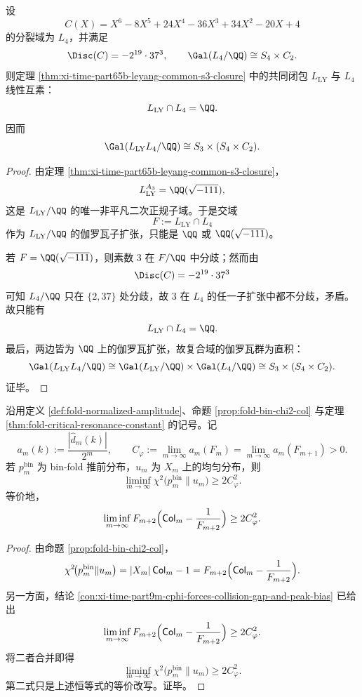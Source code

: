 \begin{corollary}\label{cor:xi-time-part65b-leyang-lattes-linear-disjointness}
设
\[
C(X)=X^6-8X^5+24X^4-36X^3+34X^2-20X+4
\]
的分裂域为 \(L_4\)，并满足
\[
\Disc(C)=-2^{19}\cdot 37^3,
\qquad
\Gal(L_4/\QQ)\cong S_4\times C_2.
\]
则定理 \ref{thm:xi-time-part65b-leyang-common-s3-closure} 中的共同闭包 \(L_{\mathrm{LY}}\) 与 \(L_4\) 线性互素：
\[
L_{\mathrm{LY}}\cap L_4=\QQ.
\]
因而
\[
\Gal(L_{\mathrm{LY}}L_4/\QQ)
\cong
S_3\times (S_4\times C_2).
\]
\end{corollary}
\begin{proof}
由定理 \ref{thm:xi-time-part65b-leyang-common-s3-closure}，
\[
L_{\mathrm{LY}}^{A_3}=\QQ(\sqrt{-111}),
\]
这是 \(L_{\mathrm{LY}}/\QQ\) 的唯一非平凡二次正规子域。于是交域
\[
F:=L_{\mathrm{LY}}\cap L_4
\]
作为 \(L_{\mathrm{LY}}/\QQ\) 的伽罗瓦子扩张，只能是 \(\QQ\) 或 \(\QQ(\sqrt{-111})\)。

若 \(F=\QQ(\sqrt{-111})\)，则素数 \(3\) 在 \(F/\QQ\) 中分歧；然而由
\[
\Disc(C)=-2^{19}\cdot 37^3
\]
可知 \(L_4/\QQ\) 只在 \(\{2,37\}\) 处分歧，故 \(3\) 在 \(L_4\) 的任一子扩张中都不分歧，矛盾。故只能有
\[
L_{\mathrm{LY}}\cap L_4=\QQ.
\]
最后，两边皆为 \(\QQ\) 上的伽罗瓦扩张，故复合域的伽罗瓦群为直积：
\[
\Gal(L_{\mathrm{LY}}L_4/\QQ)
\cong
\Gal(L_{\mathrm{LY}}/\QQ)\times \Gal(L_4/\QQ)
\cong
S_3\times (S_4\times C_2).
\]
证毕。
\end{proof}

\begin{theorem}\label{thm:xi-time-part65b-cphi-chi2-gap-floor}
沿用定义 \ref{def:fold-normalized-amplitude}、命题 \ref{prop:fold-bin-chi2-col} 与定理 \ref{thm:fold-critical-resonance-constant} 的记号。记
\[
a_m(k):=\frac{|\widehat d_m(k)|}{2^m},
\qquad
C_\varphi:=\lim_{m\to\infty}a_m(F_m)=\lim_{m\to\infty}a_m(F_{m+1})>0.
\]
若 \(p_m^{\mathrm{bin}}\) 为 bin-fold 推前分布，\(u_m\) 为 \(X_m\) 上的均匀分布，则
\[
\liminf_{m\to\infty}\chi^2\!\bigl(p_m^{\mathrm{bin}}\|u_m\bigr)\ge 2C_\varphi^2.
\]
等价地，
\[
\liminf_{m\to\infty}
F_{m+2}\Bigl(\mathsf{Col}_m-\frac{1}{F_{m+2}}\Bigr)
\ge
2C_\varphi^2.
\]
\end{theorem}
\begin{proof}
由命题 \ref{prop:fold-bin-chi2-col}，
\[
\chi^2\!\bigl(p_m^{\mathrm{bin}}\|u_m\bigr)
=
|X_m|\,\mathsf{Col}_m-1
=
F_{m+2}\Bigl(\mathsf{Col}_m-\frac{1}{F_{m+2}}\Bigr).
\]
另一方面，结论 \ref{con:xi-time-part9m-cphi-forces-collision-gap-and-peak-bias} 已给出
\[
\liminf_{m\to\infty}
F_{m+2}\Bigl(\mathsf{Col}_m-\frac{1}{F_{m+2}}\Bigr)
\ge
2C_\varphi^2.
\]
将二者合并即得
\[
\liminf_{m\to\infty}\chi^2\!\bigl(p_m^{\mathrm{bin}}\|u_m\bigr)\ge 2C_\varphi^2.
\]
第二式只是上述恒等式的等价改写。证毕。
\end{proof}

